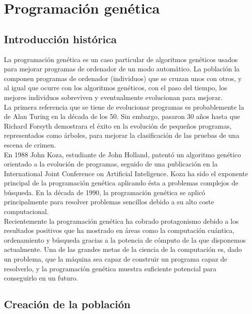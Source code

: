 \documentclass[12pt]{article} \usepackage[utf8x]{inputenc}
\begin{document}
\section{Programación genética}


\subsection{Introducción histórica}


La programación genética es un caso particular de algoritmos genéticos
usados para mejorar programas de ordenador de un modo automático.  La
población la componen programas de ordenador (individuos) que se
cruzan unos con otros, y al igual que ocurre con los algoritmos
genéticos, con el paso del tiempo, los mejores individuos sobreviven
y eventualmente evolucionan para mejorar. \\

La primera referencia que se tiene de evolucionar programas es
probablemente la de Alan Turing en la década de los 50. Sin embargo,
pasaron 30 años hasta que Richard Forsyth demostrara el éxito en la
evolución de pequeños programas, representados como árboles,
para mejorar la clasificación de las pruebas de una escena de crimen.\\

En 1988 John Koza, estudiante de John Holland, patentó un algoritmo
genético orientado a la evolución de programas, seguido de una
publicación en la International Joint Conference on Artificial
Inteligence. Koza ha sido el exponente principal de la programación
genética aplicando ésta a problemas complejos de búsqueda.
En la década de 1990, la programación genética se aplicó
principalmente para resolver problemas sencillos debido a su alto
coste computacional.\\

Recientemente la programación genética ha cobrado protagonismo debido
a los resultados positivos que ha mostrado en áreas como la computación
cuántica, ordenamiento y búsqueda gracias a la potencia de cómputo de
la que disponemos actualmente. Una de las grandes metas de la ciencia
de la computación es, dado un problema, que la máquina sea capaz de
construir un programa capaz de resolverlo, y la programación genética
muestra suficiente potencial para conseguirlo en un futuro.\\


\subsection {Creación de la población}
\end{document}
